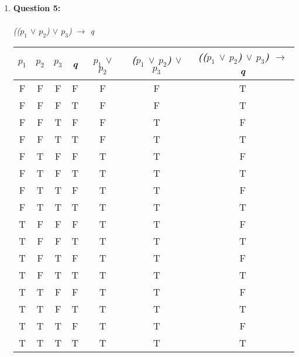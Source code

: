 \documentclass[11pt]{article}
\begin{document}
\begin{enumerate}
\item
\textbf {Question 5: } %
\\ \\
\textit {
(($p_1$ $\lor$ $p_2$) $\lor$ $p_3$) $\to$ q
} \\
\begin {tabular} {c|c|c|c|c|c|c} 
    \textit {$p_1$} & \textit {$p_2$} & \textit {$p_3$} & \textit {q} & \textit {$p_1$ $\lor$ $p_2$} & \textit {($p_1$ $\lor$ $p_2$) $\lor$ $p_3$} & \textit {(($p_1$ $\lor$ $p_2$) $\lor$ $p_3$) $\to$ q} \\
    \hline
    F & F & F & F & F & F & T \\
    F & F & F & T & F & F & T \\
    \hline
    F & F & T & F & F & T & F \\
    F & F & T & T & F & T & T \\
    \hline
    F & T & F & F & T & T & F \\
    F & T & F & T & T & T & T \\
    \hline 
    F & T & T & F & T & T & F \\
    F & T & T & T & T & T & T \\
    \hline
    T & F & F & F & T & T & F \\
    T & F & F & T & T & T & T \\
    \hline
    T & F & T & F & T & T & F \\
    T & F & T & T & T & T & T \\
    \hline
    T & T & F & F & T & T & F \\
    T & T & F & T & T & T & T \\
    \hline
    T & T & T & F & T & T & F \\
    T & T & T & T & T & T & T \\
\end {tabular} \\ \\ \\ \\ \\ \\ \\ \\ \\ \\ \\ \\ \\ \\ \\ \\ \\ \\ \\ \\

\end{enumerate}
\end{document}

